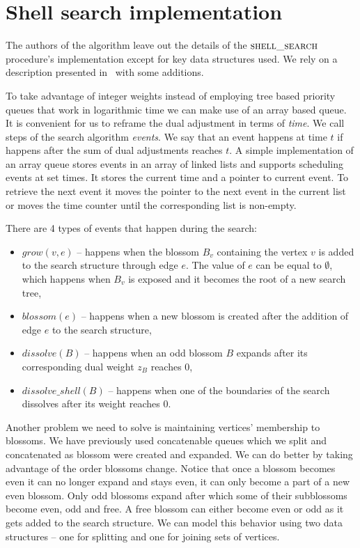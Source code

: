 \section{Shell search implementation}

The authors of the algorithm leave out the details of the $\textsc{shell\_search}$ procedure's implementation except for key data structures used. We rely on a description presented in~\cite{duan2018scaling} with some additions.

To take advantage of integer weights instead of employing tree based priority queues that work in logarithmic time we can make use of an array based queue. It is convenient for us to reframe the dual adjustment in terms of \textit{time}. We call steps of the search algorithm \textit{events}. We say that an event happens at time $t$ if happens after the sum of dual adjustments reaches $t$. A simple implementation of an array queue stores events in an array of linked lists and supports scheduling events at set times. It stores the current time and a pointer to current event. To retrieve the next event it moves the pointer to the next event in the current list or moves the time counter until the corresponding list is non-empty.

There are 4 types of events that happen during the search:

\begin{itemize}
    \item $grow(v, e)$ – happens when the blossom $B_v$ containing the vertex $v$ is added to the search structure through edge $e$. The value of $e$ can be equal to $\emptyset$, which happens when $B_v$ is exposed and it becomes the root of a new search tree,
    \item $blossom(e)$ – happens when a new blossom is created after the addition of edge $e$ to the search structure,
    \item $dissolve(B)$ – happens when an odd blossom $B$ expands after its corresponding dual weight $z_B$ reaches $0$,
    \item $dissolve\_shell(B)$ – happens when one of the boundaries of the search dissolves after its weight reaches $0$. 
\end{itemize}

Another problem we need to solve is maintaining vertices' membership to blossoms. We have previously used concatenable queues which we split and concatenated as blossom were created and expanded. We can do better by taking advantage of the order blossoms change. Notice that once a blossom becomes even it can no longer expand and stays even, it can only become a part of a new even blossom. Only odd blossoms expand after which some of their subblossoms become even, odd and free. A free blossom can either become even or odd as it gets added to the search structure. We can model this behavior using two data structures – one for splitting and one for joining sets of vertices.

